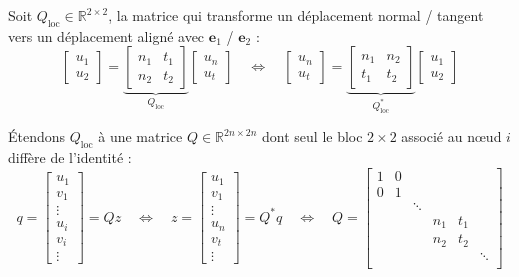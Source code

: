 \documentclass[12pt]{article}
\begin{document}
Soit $Q_{\textrm{loc}} \in \mathbb{R}^{2\times 2}$, la matrice qui transforme 
un déplacement normal / tangent vers un déplacement aligné avec $\mathbf{e}_1$ /
$\mathbf{e}_2$ :
\begin{equation}
    \begin{bmatrix}
        u_1\\
        u_2
    \end{bmatrix} = 
    \underbrace{
    \begin{bmatrix}
        n_1 & t_1\\
        n_2 & t_2
    \end{bmatrix}}_{Q_{\textrm{loc}}}
    \begin{bmatrix}
        u_n \\
        u_t
    \end{bmatrix} \quad\iff\quad
    \begin{bmatrix}
        u_n\\
        u_t
    \end{bmatrix} =
    \underbrace{
    \begin{bmatrix}
        n_1 & n_2\\
        t_1 & t_2
    \end{bmatrix}}_{Q_{\textrm{loc}}^{*}}
    \begin{bmatrix}
        u_1\\
        u_2
    \end{bmatrix}
\end{equation}

Étendons $Q_{\textrm{loc}}$ à une matrice $Q \in \mathbb{R}^{2n\times 2n}$
dont seul le bloc $2\times 2$ associé au n\oe ud $i$ diffère de l'identité :
\begin{equation}
    q = 
    \begin{bmatrix}
        u_1\\
        v_1\\
        \vdots\\
        u_i\\
        v_i\\
        \vdots
    \end{bmatrix} = 
    Q z \quad\iff\quad
    z =
    \begin{bmatrix}
        u_1\\
        v_1\\
        \vdots\\
        u_n\\
        v_t\\
        \vdots
    \end{bmatrix} = 
    Q^{*} q \quad\iff\quad
    Q = 
    \begin{bmatrix}
        1 & 0 & & & & \\
        0 & 1 & & & & \\
        & & \ddots & & & \\
        & & & n_1 & t_1 & \\
        & & & n_2 & t_2 & \\
        & & & & & \ddots\\
    \end{bmatrix}
\end{equation}
\end{document}
